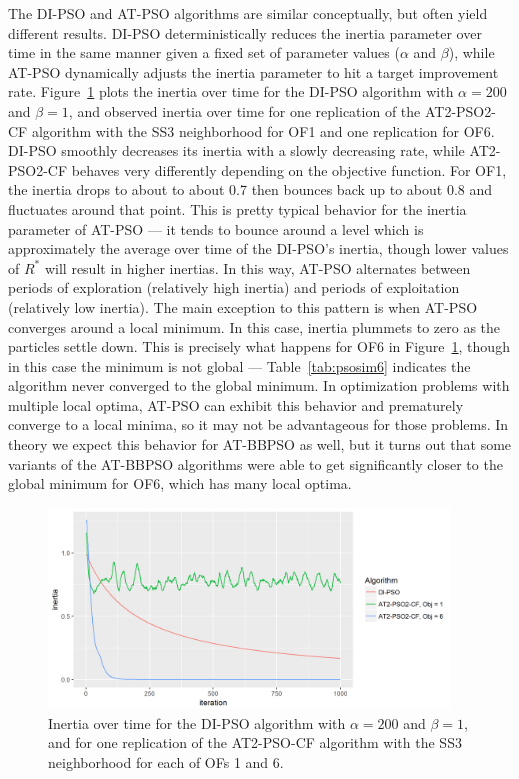 \documentclass[cmbright]{staauth}
\begin{document}
The DI-PSO and AT-PSO algorithms are similar conceptually, but often yield different results. DI-PSO deterministically reduces the inertia parameter over time in the same manner given a fixed set of parameter values ($\alpha$ and $\beta$), while AT-PSO dynamically adjusts the inertia parameter to hit a target improvement rate. Figure~\ref{fig:inertia} plots the inertia over time for the DI-PSO algorithm with $\alpha=200$ and $\beta=1$, and observed inertia over time for one replication of the AT2-PSO2-CF algorithm with the SS3 neighborhood for OF1 and one replication for OF6. DI-PSO smoothly decreases its inertia with a slowly decreasing rate, while AT2-PSO2-CF behaves very differently depending on the objective function. For OF1, the inertia drops to about to about 0.7 then bounces back up to about 0.8 and fluctuates around that point. This is pretty typical behavior for the inertia parameter of AT-PSO --- it tends to bounce around a level which is approximately the average over time of the DI-PSO's inertia, though lower values of $R^*$ will result in higher inertias. In this way, AT-PSO alternates between periods of exploration (relatively high inertia) and periods of exploitation (relatively low inertia). The main exception to this pattern is when AT-PSO converges around a local minimum. In this case, inertia plummets to zero as the particles settle down. This is precisely what happens for OF6 in Figure~\ref{fig:inertia}, though in this case the minimum is not global --- Table~\ref{tab:psosim6} indicates the algorithm never converged to the global minimum. In optimization problems with multiple local optima, AT-PSO can exhibit this behavior and prematurely converge to a local minima, so it may not be advantageous for those problems. In theory we expect this behavior for AT-BBPSO as well, but it turns out that some variants of the AT-BBPSO algorithms were able to get significantly closer to the global minimum for OF6, which has many local optima.

\begin{figure}[p]
\centering
\includegraphics[width=0.95\textwidth]{../code/psosims/inertiaplot.png}
\caption{Inertia over time for the DI-PSO algorithm with $\alpha=200$ and $\beta=1$, and for one replication of the AT2-PSO-CF algorithm with the SS3 neighborhood for each of OFs 1 and 6.}
\label{fig:inertia}
\end{figure}
\end{document}

